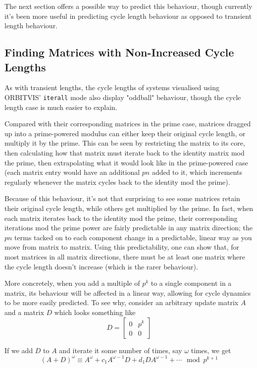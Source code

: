 \documentclass[a4paper, 12pt, reqno]{amsart}
\newcommand{\ssubsection}[1]{\vspace{0.25cm}\subsection{#1}}
\begin{document}
			The next section offers a possible way to predict this behaviour, though currently it's been more useful in
			predicting cycle length behaviour as opposed to transient length behaviour.
			
		\ssubsection{Finding Matrices with Non-Increased Cycle Lengths} %
			As with transient lengths, the cycle lengths of systems visualised using ORBITVIS' \texttt{iterall} mode also 
			display "oddball" behaviour, though the cycle length case is much easier to explain.
			
			Compared with their corresponding matrices in the prime case, matrices dragged up into a prime-powered modulus
			can either keep their original cycle length, or multiply it by the prime. This can be seen by restricting the
			matrix to its core, then calculating how that matrix must iterate back to the identity matrix mod the prime, then
			extrapolating what it would look like in the prime-powered case (each matrix entry would have an additional 
			$pn$ added to it, which increments regularly whenever the matrix cycles back to the identity mod the prime). 
			
			Because of this behaviour, it's not that surprising to see some matrices retain their original cycle length,
			while others get multiplied by the prime. In fact, when each matrix iterates back to the identity mod the prime,
			their corresponding iterations mod the prime power are fairly predictable in any matrix direction; the $pn$ terms
			tacked on to each component change in a predictable, linear way as you move from matrix to matrix. Using this
			predictability, one can show that, for most matrices in all matrix directions, there must be at least one matrix 
			where the cycle length doesn't increase (which is the rarer behaviour).
			
			More concretely, when you add a multiple of $p^k$ to a single component in a matrix, its behaviour will be
			affected in a linear way, allowing for cycle dynamics to be more easily predicted. To see why, consider an
			arbitrary update matrix $A$ and a matrix $D$ which looks something like
			\[
				D = 
				\begin{bmatrix}
					0 & p^k \\
					0 & 0
				\end{bmatrix}
			\]
	
			If we add $D$ to $A$ and iterate it some number of times, say $\omega$ times, we get
			\[
				(A+D)^{\omega} \equiv A^{\omega} + c_{1}A^{\omega-1}D + d_{1}DA^{\omega-1} + \cdots \mod{p^{k+1}}
			\]
			
\end{document}
